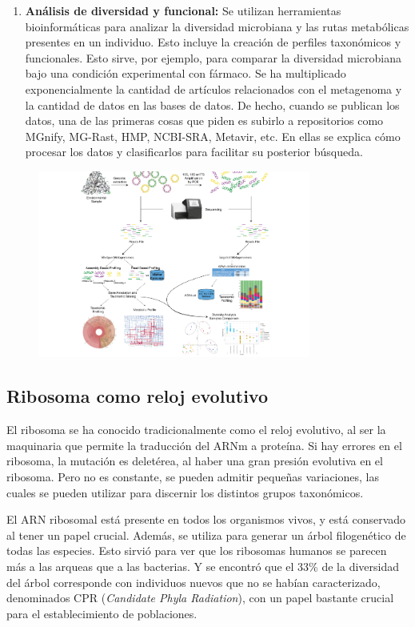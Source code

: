 \begin{enumerate}
\item \textbf{Análisis de diversidad y funcional:} Se utilizan herramientas bioinformáticas para analizar la diversidad microbiana y las rutas metabólicas presentes en un individuo. Esto incluye la creación de perfiles taxonómicos y funcionales. Esto sirve, por ejemplo, para comparar la diversidad microbiana bajo una condición experimental con fármaco. Se ha multiplicado exponencialmente la cantidad de artículos relacionados con el metagenoma y la cantidad de datos en las bases de datos. De hecho, cuando se publican los datos, una de las primeras cosas que piden es subirlo a repositorios como MGnify, MG-Rast, HMP, NCBI-SRA, Metavir, etc. En ellas se explica cómo procesar los datos y clasificarlos para facilitar su posterior búsqueda.
\end{enumerate}

\begin{figure}[h]
\centering
\includegraphics[width = 0.8\textwidth]{figs/metagenomic-pipeline.png}
\end{figure}

\subsection{Ribosoma como reloj evolutivo}
El ribosoma se ha conocido tradicionalmente como el reloj evolutivo, al ser la maquinaria que permite la traducción del ARNm a proteína. Si hay errores en el ribosoma, la mutación es deletérea, al haber una gran presión evolutiva en el ribosoma. Pero no es constante, se pueden admitir pequeñas variaciones, las cuales se pueden utilizar para discernir los distintos grupos taxonómicos. 

El ARN ribosomal está presente en todos los organismos vivos, y está conservado al tener un papel crucial. Además, se utiliza para generar un árbol filogenético de todas las especies. Esto sirvió para ver que los ribosomas humanos se parecen más a las arqueas que a las bacterias. Y se encontró que el 33\% de la diversidad del árbol corresponde con individuos nuevos que no se habían caracterizado, denominados CPR (\textit{Candidate Phyla Radiation}), con un papel bastante crucial para el establecimiento de poblaciones.

